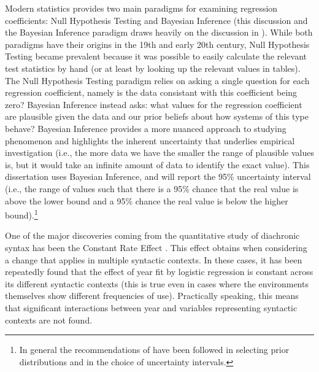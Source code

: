 	Modern statistics provides two main paradigms for examining regression coefficients: Null Hypothesis Testing and Bayesian Inference (this discussion and the Bayesian Inference paradigm draws heavily on the discussion in \citealt{Kruschke.2010}). While both paradigms have their origins in the 19th and early 20th century, Null Hypothesis Testing became prevalent because it was possible to easily calculate the relevant test statistics by hand (or at least by looking up the relevant values in tables). The Null Hypothesis Testing paradigm relies on asking a single question for each regression coefficient, namely is the data consistant with this coefficient being zero? Bayesian Inference instead asks: what values for the regression coefficient are plausible given the data and our prior beliefs about how systems of this type behave? Bayesian Inference provides a more nuanced approach to studying phenomenon and highlights the inherent uncertainty that underlies empirical investigation (i.e., the more data we have the smaller the range of plausible values is, but it would take an infinite amount of data to identify the exact value). This dissertation uses Bayesian Inference, and will report the 95\% uncertainty interval (i.e., the range of values such that there is a 95\% chance that the real value is above the lower bound and a 95\% chance the real value is below the higher bound).\footnote{In general the recommendations of \cite{Gelman.2008} have been followed in selecting prior distributions and in the choice of uncertainty intervals.}

	One of the major discoveries coming from the quantitative study of diachronic syntax has been the Constant Rate Effect \citep{Kroch.1989,Kroch.1994}. This effect obtains when considering a change that applies in multiple syntactic contexts. In these cases, it has been repeatedly found that the effect of year fit by logistic regression is constant across its different syntactic contexts (this is true even in cases where the environments themselves show different frequencies of use). Practically speaking, this means that significant interactions between year and variables representing syntactic contexts are not found.

